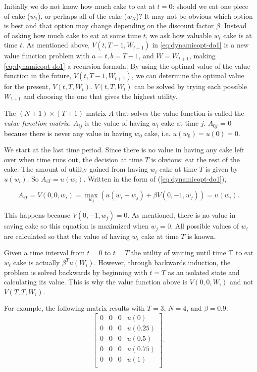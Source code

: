 Initially we do not know how much cake to eat at $t = 0$: should we eat one piece of cake ($w_1$), or perhaps all of the cake ($w_N$)?
It may not be obvious which option is best and that option may change depending on the discount factor $\beta$.
Instead of asking how much cake to eat at some time $t$, we ask how valuable $w_i$ cake is at time $t$.
As mentioned above, $V(t, T-1, W_{t+1})$ in \ref{eq:dynamicopt-do1} is a new value function problem with $a = t, b = T-1$, and $W = W_{t+1}$, making \ref{eq:dynamicopt-do1} a recursion formula.
By using the optimal value of the value function in the future, $V(t, T-1, W_{t+1})$, we can determine the optimal value for the present, $V(t, T, W_{t})$.
$V(t, T, W_{t})$ can be solved by trying each possible $W_{t+1}$ and choosing the one that gives the highest utility.


The $(N+1) \times (T+1)$ matrix $A$ that solves the value function is called the \emph{value function matrix}.
$A_{ij}$ is the value of having $w_i$ cake at time $j$.
$A_{0j}$ = 0 because there is never any value in having $w_0$ cake, i.e. $u(w_0) = u(0) = 0$.

We start at the last time period.
Since there is no value in having any cake left over when time runs out, the decision at time $T$ is obvious: eat the rest of the cake.
The amount of utility gained from having $w_i$ cake at time $T$ is given by $u(w_i)$.
So $A_{iT} = u(w_i)$.
Written in the form of (\ref{eq:dynamicopt-do1}),

\begin{equation}\label{eq:dynamicopt-do2}
A_{iT} = V(0, 0, w_{i}) = \max_{w_{j}} \left(u(w_{i} - w_{j}) + \beta V(0, -1, w_{j})\right) = u(w_{i}).
\end{equation}

This happens because $V(0,-1,w_j) = 0$.
As mentioned, there is no value in saving cake so this equation is maximized when $w_j = 0$.
All possible values of $w_{i}$ are calculated so that the value of having $w_i$ cake at time $T$ is known.

\begin{warn}
Given a time interval from $t=0$ to $t=T$ the utility of waiting until time T to eat $w_i$ cake is actually $\beta^Tu(W_{i})$.
However, through backwards induction, the problem is solved backwards by beginning with $t=T$ as an isolated state and calculating its value.
This is why the value function above is $V(0, 0, W_i)$ and not $V(T, T, W_i)$.
\end{warn}

For example, the following matrix results with $T=3$, $N=4$, and $\beta=0.9$.
\[
\begin{bmatrix}
0 & 0 & 0 & u(0) \\
0 & 0 & 0 & u(0.25) \\
0 & 0 & 0 & u(0.5) \\
0 & 0 & 0 & u(0.75) \\
0 & 0 & 0 & u(1) \\
\end{bmatrix}.
\]



